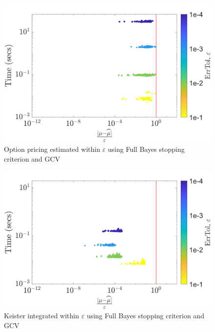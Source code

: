 \documentclass[twocolumn]{svjour3}          %
\begin{document}
\begin{figure}
	\centering
	\includegraphics[width=0.95\linewidth]{"figures/optPrice_guaranteed_time_GCV_Baker_29-Jul-2018 05-00-29"}
	\caption[OptPrice guaranteed : GCV]{Option pricing estimated within $\varepsilon$ using Full Bayes stopping criterion and GCV}
	\label{fig:optprice-guaranteed-GCV}
\end{figure}
\begin{figure}
	\centering
	\includegraphics[width=0.95\linewidth]{"figures/Keister_guaranteed_time_GCV_C2sin_29-Jul-2018 04-03-33"}
	\caption[Keister guaranteed: GCV]{Keister integrated within $\varepsilon$ using Full Bayes stopping criterion and GCV}
	\label{fig:keister-guaranteed-GCV}
\end{figure}
\end{document}
